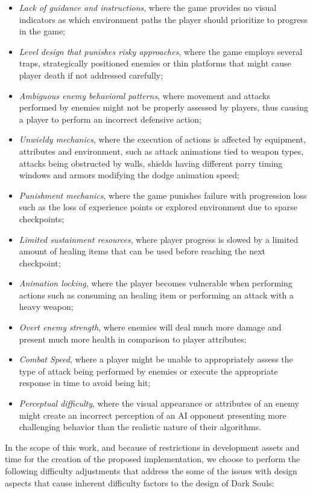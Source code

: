 \begin{itemize}
    \item{\emph{Lack of guidance and instructions}, where the game provides no visual indicators as which environment paths the player should prioritize to progress in the game;}
    \item {\emph{Level design that punishes risky approaches}, where the game employs several traps, strategically positioned enemies or thin platforms that might cause player death if not addressed carefully;}
    \item {\emph{Ambiguous enemy behavioral patterns}, where movement and attacks performed by enemies might not be properly assessed by players, thus causing a player to perform an incorrect defensive action;}
    \item {\emph{Unwieldy mechanics}, where the execution of actions is affected by equipment, attributes and environment, such as attack animations tied to weapon types, attacks being obstructed by walls, shields having different parry timing windows and armors modifying the dodge animation speed;}
    \item {\emph{Punishment mechanics}, where the game punishes failure with progression loss such as the loss of experience points or explored environment due to sparse checkpoints;}
    \item {\emph{Limited sustainment resources}, where player progress is slowed by a limited amount of healing items that can be used before reaching the next checkpoint;}
    \item {\emph{Animation locking}, where the player becomes vulnerable when performing actions such as consuming an healing item or performing an attack with a heavy weapon;}
    \item {\emph{Overt enemy strength}, where enemies will deal much more damage and present much more health in comparison to player attributes;}
    \item {\emph{Combat Speed}, where a player might be unable to appropriately assess the type of attack being performed by enemies or execute the appropriate response in time to avoid being hit;}
    \item {\emph{Perceptual difficulty}, where the visual appearance or attributes of an enemy might create an incorrect perception of an AI opponent presenting more challenging behavior than the realistic nature of their algorithms.}
\end{itemize}

In the scope of this work, and because of restrictions in development assets and time for the creation of the proposed implementation, we choose to perform the following difficulty adjustments that address the some of the issues with design aspects that cause inherent difficulty factors to the design of Dark Souls: 

